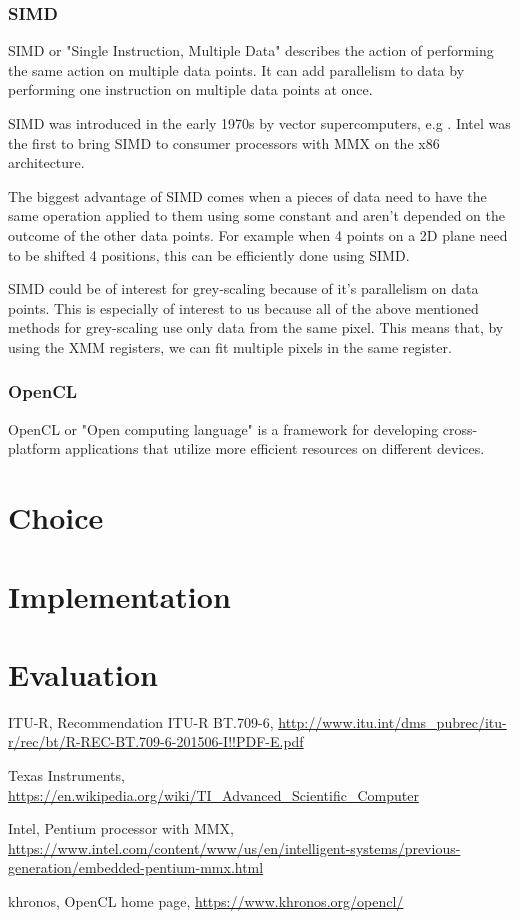 \documentclass[a4paper]{article}
\begin{document}
\subsubsection{SIMD}
SIMD or "Single Instruction, Multiple Data" describes the action of performing the same action on multiple data points. It can add parallelism to data by performing one instruction on multiple data points at once.

SIMD was introduced in the early 1970s by vector supercomputers, e.g \cite{TI-ASC}.
Intel was the first to bring SIMD to consumer processors with MMX\cite{INTEL-MMX} on the x86 architecture.

The biggest advantage of SIMD comes when a pieces of data need to have the same operation applied to them using some constant and aren't depended on the outcome of the other data points. For example when 4 points on a 2D plane need to be shifted 4 positions, this can be efficiently done using SIMD.

SIMD could be of interest for grey-scaling because of it's parallelism on data points. This is especially of interest to us because all of the above mentioned methods for grey-scaling use only data from the same pixel. This means that, by using the XMM registers, we can fit multiple pixels in the same register.

\subsubsection{OpenCL}
OpenCL\cite{OPENCL} or "Open computing language" is a framework for developing cross-platform applications that utilize more efficient resources on different devices.

\section{Choice}

\section{Implementation}

\section{Evaluation}

\begin{thebibliography}{9}

	ITU-R,
	Recommendation  ITU-R  BT.709-6,	
	\url{http://www.itu.int/dms_pubrec/itu-r/rec/bt/R-REC-BT.709-6-201506-I!!PDF-E.pdf}
  
	Texas Instruments,
	\url{https://en.wikipedia.org/wiki/TI_Advanced_Scientific_Computer}
 
Intel,
Pentium processor with MMX,
\url{https://www.intel.com/content/www/us/en/intelligent-systems/previous-generation/embedded-pentium-mmx.html}

khronos,
OpenCL home page,
\url{https://www.khronos.org/opencl/}

\end{thebibliography}
\end{document}
